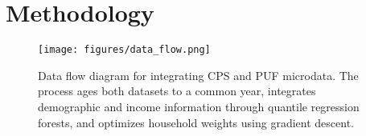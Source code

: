 \section{Methodology}\label{sec:methodology}

\begin{figure}[h]
    \centering
    \texttt{[image: figures/data\_flow.png]}
    \caption{Data flow diagram for integrating CPS and PUF microdata. The process ages both datasets to a common year, integrates demographic and income information through quantile regression forests, and optimizes household weights using gradient descent.}
    \label{fig:data_flow}
\end{figure}




  





